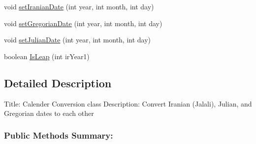 \begin{DoxyCompactItemize}
\item 
void \hyperlink{classcom_1_1_seyed_ali_roshan_1_1www_1_1_calendar_tool_abc55d566a57a157009a5c40b7a0fb53f}{set\+Iranian\+Date} (int year, int month, int day)
\item 
void \hyperlink{classcom_1_1_seyed_ali_roshan_1_1www_1_1_calendar_tool_a6299181390578255631f827c7bb1f358}{set\+Gregorian\+Date} (int year, int month, int day)
\item 
void \hyperlink{classcom_1_1_seyed_ali_roshan_1_1www_1_1_calendar_tool_ae50de6d166135c2b5b7d107d37ca201e}{set\+Julian\+Date} (int year, int month, int day)
\item 
boolean \hyperlink{classcom_1_1_seyed_ali_roshan_1_1www_1_1_calendar_tool_a281b3d746597ab1d1c5b0509407017b6}{Is\+Leap} (int ir\+Year1)
\end{DoxyCompactItemize}


\subsection{Detailed Description}
Title\+: Calender Conversion class Description\+: Convert Iranian (Jalali), Julian, and Gregorian dates to each other \subsubsection*{Public Methods Summary\+: }

